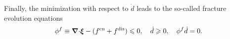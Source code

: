 Finally, the minimization with respect to $\dot{d}$ leads to the so-called fracture evolution equations
\begin{align}
  \phi^f \equiv {\boldsymbol{\nabla}\cdot} \boldsymbol{\xi} - (f^\text{en} + f^\text{dis}) \leqslant 0, \quad \dot{d} \geqslant 0, \quad \phi^f\dot{d} = 0. \label{eq: fracture envolope}
\end{align}
